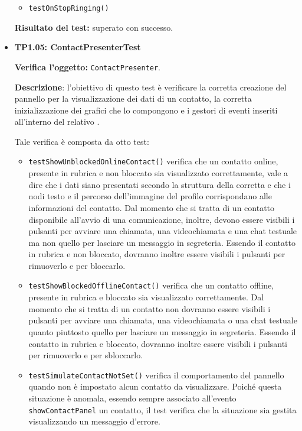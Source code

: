 \begin{itemize}
\begin{itemize}
\item \texttt{testOnStopRinging()}

\end{itemize}
\textbf{Risultato del test:} superato con successo.

\item[\passed] \textbf{TP1.05: ContactPresenterTest}

\textbf{Verifica l'oggetto:} \texttt{ContactPresenter}.

\textbf{Descrizione}: l'obiettivo di questo test è verificare la corretta creazione del pannello per la visualizzazione dei dati di un contatto, la corretta inizializzazione dei  grafici che lo compongono e i gestori di eventi inseriti all'interno del relativo .

Tale verifica è composta da otto test:
\begin{itemize}

\item \texttt{testShowUnblockedOnlineContact()} verifica che un contatto online, presente in rubrica e non bloccato sia visualizzato correttamente, vale a dire che i dati siano presentati secondo la struttura della  corretta e che i nodi testo e il percorso dell'immagine del profilo corrispondano alle informazioni del contatto. Dal momento che si tratta di un contatto disponibile all'avvio di una comunicazione, inoltre, devono essere visibili i pulsanti per avviare una chiamata, una videochiamata e una chat testuale ma non quello per lasciare un messaggio in segreteria. Essendo il contatto in rubrica e non bloccato, dovranno inoltre essere visibili i pulsanti per rimuoverlo e per bloccarlo.

\item \texttt{testShowBlockedOfflineContact()} verifica che un contatto offline, presente in rubrica e bloccato sia visualizzato correttamente. Dal momento che si tratta di un contatto  non dovranno essere visibili i pulsanti per avviare una chiamata, una videochiamata o una chat testuale quanto piuttosto quello per lasciare un messaggio in segreteria. Essendo il contatto in rubrica e bloccato, dovranno inoltre essere visibili i pulsanti per rimuoverlo e per sbloccarlo.


\item \texttt{testSimulateContactNotSet()} verifica il comportamento del pannello quando non è impostato alcun contatto da visualizzare. Poiché questa situazione è anomala, essendo sempre associato all'evento \verb'showContactPanel' un contatto, il test verifica che la situazione sia gestita visualizzando un messaggio d'errore.


\end{itemize}
\end{itemize}
